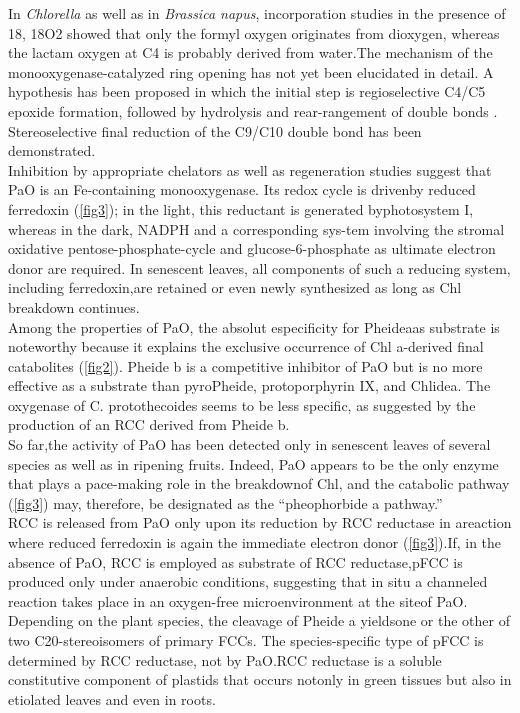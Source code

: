 \documentclass[a4paper, twocolumn, 11pt]{article}
\begin{document}
	In \textit{Chlorella} \cite{CurtyChristophe;Engel1995} as well as in \textit{Brassica napus}, incorporation studies in the presence of 18, 18O2 showed that only the formyl oxygen originates from dioxygen, whereas the lactam oxygen at C4 is probably derived from water.The mechanism of the monooxygenase-catalyzed ring opening has not yet been elucidated in detail. A hypothesis has been proposed in which the initial step is regioselective C4/C5 epoxide formation, followed by hydrolysis and rear-rangement of double bonds \cite{CurtyChristophe;Engel1995}. Stereoselective ﬁnal reduction of the C9/C10 double bond has been demonstrated. \\
	

	Inhibition by appropriate chelators as well as regeneration studies suggest that PaO is an Fe-containing monooxygenase. Its redox cycle is drivenby reduced ferredoxin (\ref{fig3}); in the light, this reductant is generated byphotosystem I, whereas in the dark, NADPH and a corresponding sys-tem involving the stromal oxidative pentose-phosphate-cycle and glucose-6-phosphate as ultimate electron donor are required. In senescent leaves, all components of such a reducing system, including ferredoxin,are retained or even newly synthesized as long as Chl breakdown continues.\\
	
	Among the properties of PaO, the absolut especiﬁcity for Pheideaas substrate is noteworthy because it explains the exclusive occurrence of Chl a-derived ﬁnal catabolites (\ref{fig2}). Pheide b is a competitive inhibitor of PaO but is no more effective as a substrate than pyroPheide, protoporphyrin IX, and Chlidea. The oxygenase of C. protothecoides seems to be less speciﬁc, as suggested by the production of an RCC derived from Pheide b.\\ 
	
	So far,the activity of PaO has been detected only in senescent leaves of several species as well as in ripening fruits. Indeed, PaO appears to be the only enzyme that plays a pace-making role in the breakdownof Chl, and the catabolic pathway (\ref{fig3}) may, therefore, be designated as the “pheophorbide a pathway.”\\
	
	RCC is released from PaO only upon its reduction by RCC reductase in areaction where reduced ferredoxin is again the immediate electron donor (\ref{fig3}).If, in the absence of PaO, RCC is employed as substrate of RCC reductase,pFCC is produced only under anaerobic conditions, suggesting that in situ a channeled reaction takes place in an oxygen-free microenvironment at the siteof PaO. Depending on the plant species, the cleavage of Pheide a yieldsone or the other of two C20-stereoisomers of primary FCCs. The species-speciﬁc type of pFCC is determined by RCC reductase, not by PaO.RCC reductase is a soluble constitutive component of plastids that occurs notonly in green tissues but also in etiolated leaves and even in roots.
\end{document}
